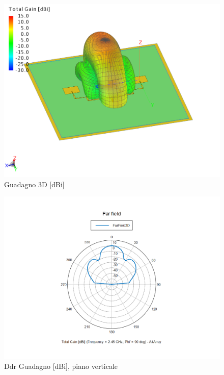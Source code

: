 \documentclass[twoside,twocolumn]{article}
\begin{document}
\begin{figure}[h]
  \includegraphics[width=\linewidth]{Array4E_Gain.png}
  \caption{Guadagno 3D [dBi]}
  \label{fig:Array4E_Gain}
\end{figure}
\begin{figure}[h]
  \includegraphics[width=\linewidth]{Array4E_verticale.png}
  \caption{Ddr Guadagno [dBi], piano verticale}
  \label{fig:Array4E_verticale}
\end{figure}
\end{document}
